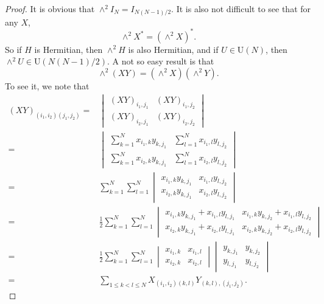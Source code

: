 \documentclass[11pt, a4paper]{article}
\numberwithin{equation}{section}
\newcommand{\Unitary}{\mathrm{U}}
\theoremstyle{definition}
\theoremstyle{remark}
\begin{document}
\begin{proof}
  It is obvious that $\wedge^2 I_N = I_{N(N - 1)/2}$. It is also not difficult to see that for any $X$,
  \begin{equation}
    \wedge^2 X^* = (\wedge^2 X)^*.
  \end{equation}
  So if $H$ is Hermitian, then $\wedge^2 H$ is also Hermitian, and if $U \in \Unitary(N)$, then $\wedge^2 U \in \Unitary(N(N - 1)/2)$. A not so easy result is that
  \begin{equation}
    \wedge^2(XY) = (\wedge^2 X)(\wedge^2 Y).
  \end{equation}
  To see it, we note that
  \begin{equation} \label{eq:Cauchy_Binet_2}
    \begin{split}
      (XY)_{(i_1, i_2)(j_1, j_2)} = {}&
      \begin{vmatrix}
        (XY)_{i_1, j_1} & (XY)_{i_1, j_2} \\
        (XY)_{i_2, j_1} & (XY)_{i_2, j_2}
      \end{vmatrix} \\
      = {}&
      \begin{vmatrix}
        \sum^N_{k = 1} x_{i_1, k} y_{k, j_1} & \sum^N_{l = 1} x_{i_1, l} y_{l, j_2} \\
        \sum^N_{k = 1} x_{i_2, k} y_{k, j_1} & \sum^N_{l = 1} x_{i_2, l} y_{l, j_2}
      \end{vmatrix} \\
      = {}& \sum^N_{k = 1} \sum^N_{l = 1}
      \begin{vmatrix}
        x_{i_1, k} y_{k, j_1} & x_{i_1, l} y_{l, j_2} \\
        x_{i_2, k} y_{k, j_1} & x_{i_2, l} y_{l, j_2}
      \end{vmatrix} \\
      = {}& \frac{1}{2} \sum^N_{k = 1} \sum^N_{l = 1}
      \begin{vmatrix}
        x_{i_1, k} y_{k, j_1} + x_{i_1, l} y_{l, j_1} & x_{i_1, k} y_{k, j_2} + x_{i_1, l} y_{l, j_2} \\
        x_{i_2, k} y_{k, j_1} + x_{i_2, l} y_{l, j_1} & x_{i_2, k} y_{k, j_2} + x_{i_2, l} y_{l, j_2}
      \end{vmatrix} \\
      = {}& \frac{1}{2} \sum^N_{k = 1} \sum^N_{l = 1}
      \begin{vmatrix}
        x_{i_1, k} & x_{i_1, l} \\
        x_{i_2, k} & x_{i_2, l}
      \end{vmatrix}
      \begin{vmatrix}
        y_{k, j_1} & y_{k, j_2} \\
        y_{l, j_1} & y_{l, j_2}
      \end{vmatrix} \\
      = {}& \sum_{1 \leq k < l \leq N} X_{(i_1, i_2)(k, l)} Y_{(k, l), (j_1, j_2)}.
    \end{split}
  \end{equation}


\end{proof}
\end{document}

